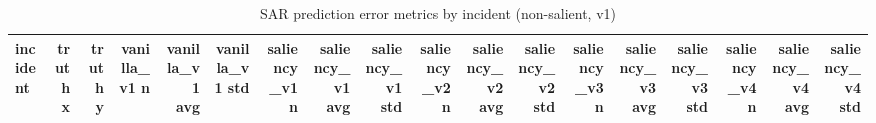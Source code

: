 \begin{table}[ht]
\centering
\caption{SAR prediction error metrics by incident (non-salient, v1)}
\label{tab:sar-incident-errors-non-salient,-v1}
\begin{tabular}{lrrrrrrrrrrrrrrrrr}
\hline
incident & truth x & truth y & vanilla\_v1 n & vanilla\_v1 avg & vanilla\_v1 std & saliency\_v1 n & saliency\_v1 avg & saliency\_v1 std & saliency\_v2 n & saliency\_v2 avg & saliency\_v2 std & saliency\_v3 n & saliency\_v3 avg & saliency\_v3 std & saliency\_v4 n & saliency\_v4 avg & saliency\_v4 std \\
\hline
\hline
\end{tabular}
\end{table}
